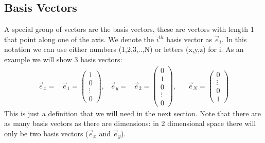 \documentclass[a4paper]{report}
\begin{document}
\subsection{Basis Vectors}
A special group of vectors are the basis vectors, these are vectors with length 1 that point along one of the axis. We denote the $i^{th}$ basis vector as $\vec{e}_i$. In this notation we can use either numbers (1,2,3,..,N) or letters (x,y,z) for i. As an example we will show 3 basis vectors:
\begin{align*}
\vec{e}_x =& \vec{e}_1 = \begin{pmatrix} 1\\0\\ \vdots \\0 \end{pmatrix}, &
\vec{e}_y =& \vec{e}_2 = \begin{pmatrix} 0\\1\\0\\ \vdots \\0 \end{pmatrix}, &
& \vec{e}_N = \begin{pmatrix} 0\\ \vdots \\0 \\1 \end{pmatrix}
\end{align*}
This is just a definition that we will need in the next section. Note that there are as many basis vectors as there are dimensions: in 2 dimensional space there will only be two basis vectors ($\vec{e}_x$ and $\vec{e}_y$).
\end{document}
